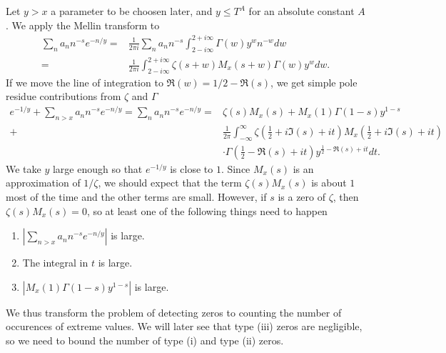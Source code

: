 Let $y>x$ a parameter to be choosen later, and $y\leq T^A$ for an absolute constant $A$. We apply the Mellin transform to \begin{equation*}
    \begin{split}
    \sum_{n}a_n n^{-s} e^{-n/y}=&\frac{1}{2\pi i}\sum_{n}a_n n^{-s} \int_{2-i\infty}^{2+i\infty}\Gamma(w) y^w n^{-w} dw\\
    =&\frac{1}{2\pi i}\int_{2-i\infty}^{2+i\infty}\zeta(s+w)M_x(s+w)\Gamma(w) y^w dw.
    \end{split}
\end{equation*}
If we move the line of integration to $\Re(w) = 1/2 - \Re(s)$, we get simple pole residue contributions from $\zeta$ and $\Gamma$ \begin{equation}
    \label{huxleyperron}
    \begin{split}
    e^{-1/y}+\sum_{n>x}a_n n^{-s} e^{-n/y}=\sum_{n}a_n n^{-s} e^{-n/y}=&\zeta(s)M_x(s) +M_x(1)\Gamma(1-s)y^{1-s}\\+&
    \frac{1}{2\pi}\int_{-\infty}^{\infty}\zeta(\frac{1}{2}+i\Im(s)+it)M_x(\frac{1}{2}+i\Im(s)+it)\\ &\cdot \Gamma\left(\frac{1}{2}-\Re(s)+it\right) y^{\frac{1}{2}-\Re(s)+it} dt.
    \end{split}
\end{equation}
We take $y$ large enough so that $e^{-1/y}$ is close to $1$. Since $M_x(s)$ is an approximation of $1/\zeta$, we should expect that the term $\zeta(s)M_x(s)$ is about $1$ most of the time and the other terms are small. However, if $s$ is a zero of $\zeta$, then $\zeta(s)M_x(s)=0$, so at least one of the following things need to happen \begin{enumerate}[label=(\roman{*})]
    \item $|\sum_{n>x}a_n n^{-s} e^{-n/y}|$ is large.
    \item The integral in $t$ is large.
    \item $|M_x(1)\Gamma(1-s)y^{1-s}|$ is large.
\end{enumerate}
We thus transform the problem of detecting zeros to counting the number of occurences of extreme values. We will later see that type (iii) zeros are negligible, so we need to bound the number of type (i) and type (ii) zeros. 


